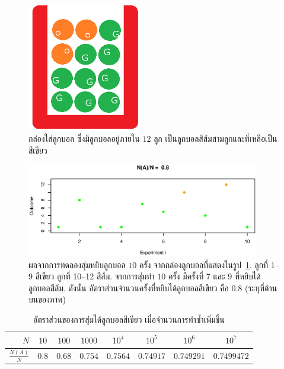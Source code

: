 %
\begin{figure}
\begin{center}
\includegraphics[width=2in]{02Prob/RedUrnMarked.png}
\end{center}
\caption{กล่องใส่ลูกบอล ซึ่งมีลูกบอลอยู่ภายใน $12$ ลูก เป็นลูกบอลสีส้มสามลูกและที่เหลือเป็นสีเขียว}
\label{fig: prob red box}
\end{figure}
%

%
\begin{figure}
\begin{center}
\includegraphics[width=4in]{02Prob/probDemo01.eps}
\end{center}
\caption{ผลจากการทดลองสุ่มหยิบลูกบอล $10$ ครั้ง จากกล่องลูกบอลที่แสดงในรูป~\ref{fig: prob red box}.
  ลูกที่ 1--9 สีเขียว ลูกที่ 10--12 สีส้ม.
  จากการสุ่มทำ $10$ ครั้ง มีครั้งที่ 7 และ 9 ที่หยิบได้ลูกบอลสีส้ม.
  ดังนั้น อัตราส่วนจำนวนครั้งที่หยิบได้ลูกบอลสีเขียว คือ $0.8$ (ระบุที่ด้านบนของภาพ)}
\label{fig: prob red box result N 10}
\end{figure}
%

\begin{table}[hbtp]
{\scriptsize
\caption{อัตราส่วนของการสุ่มได้ลูกบอลสีเขียว เมื่อจำนวนการทำซ้ำเพิ่มขึ้น}
\begin{center}
\begin{tabular}{|r|c|c|c|c|c|c|c|}
\hline 
$N$ & $10$ & $100$ & $1000$ & $10^4$ & $10^5$ & $10^6$ & $10^7$ \\
\hline 
$\frac{N(A)}{N}$ &
      $0.8$  & $0.68$  & $0.754$  & $0.7564$ & $0.74917$ & $0.749291$ &  $0.7499472$ \\
\hline
\end{tabular} 
\end{center}
\label{tbl: prob demo N(A)/N}
}%
\end{table}


